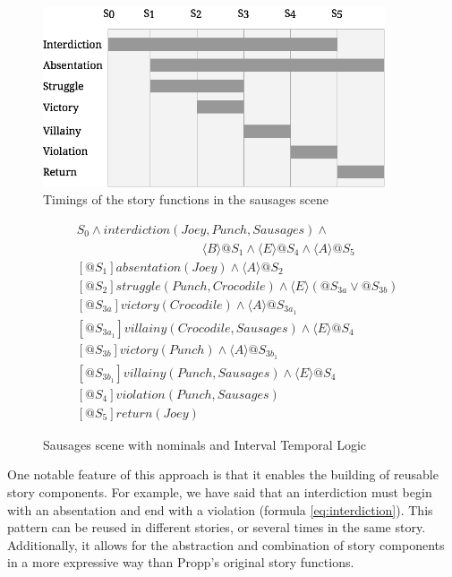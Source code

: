 \documentclass{llncs}
\def\mnote#1{\todo[color=Goldenrod,size=\scriptsize]{Matt: #1}}
\begin{document}
\begin{figure}[!t]\label{fig:durations}
  \centering
    \centerline{\includegraphics[width=0.9\textwidth]{durations.png}}
  \caption{Timings of the story functions in the sausages scene}
\end{figure}
\begin{figure}[]
\begin{align}
  &S_{0} \land \mathit{interdiction(Joey, Punch, Sausages)} \land\nonumber\\
  &\qquad\qquad\qquad\qquad\qquad\langle B \rangle @S_{1} \land \langle E \rangle @S_{4} \land \langle A \rangle @S_{5}\label{eq:interdiction}\\
  &[@S_{1}] \mathit{absentation(Joey)} \land \langle A \rangle @S_{2}\label{eq:absentation}\\
  &[@S_{2}] \mathit{struggle(Punch, Crocodile)} \land \langle E \rangle (@S_{3a} \lor @S_{3b})\label{eq:struggle}\\
  &[@S_{3a}] \mathit{victory(Crocodile)} \land \langle A \rangle @S_{3a_1}\\
  &[@S_{3a_1}] \mathit{villainy(Crocodile, Sausages)} \land \langle E \rangle @S_{4}\\
  &[@S_{3b}] \mathit{victory(Punch)} \land \langle A \rangle @S_{3b_1}\\
  &[@S_{3b_1}] \mathit{villainy(Punch, Sausages)} \land \langle E \rangle @S_{4}\\
  &[@S_{4}] \mathit{violation(Punch, Sausages)}\\
  &[@S_{5}] \mathit{return(Joey)}
\end{align}
\caption{Sausages scene with nominals and Interval Temporal Logic}\label{fig:situations}
\end{figure}


One notable feature of this approach is that it enables the building of reusable story components. For example, we have said that an interdiction must begin with an absentation and end with a violation (formula \ref{eq:interdiction}). This pattern can be reused in different stories, or several times in the same story. Additionally, it allows for the abstraction and combination of story components in a more expressive way than Propp's original story functions.\mnote{Elaborate a bit}
\end{document}
